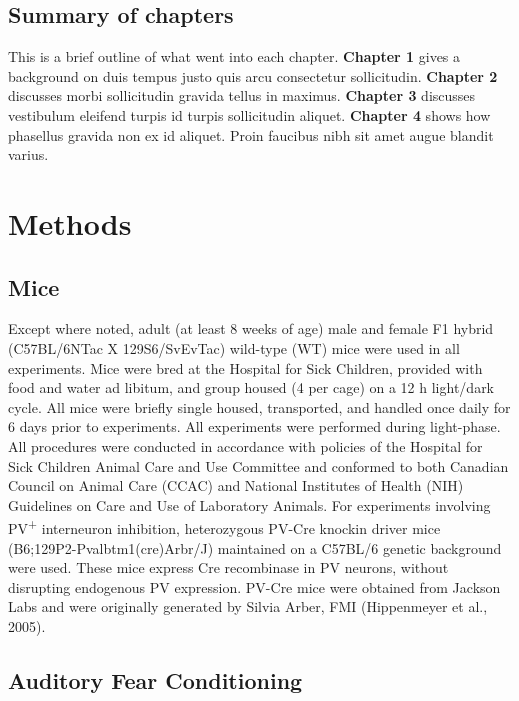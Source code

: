 \documentclass[12pt,a4paperpaper,]{report}
\begin{document}
\section{Summary of chapters}\label{summary-of-chapters}

This is a brief outline of what went into each chapter. \textbf{Chapter
1} gives a background on duis tempus justo quis arcu consectetur
sollicitudin. \textbf{Chapter 2} discusses morbi sollicitudin gravida
tellus in maximus. \textbf{Chapter 3} discusses vestibulum eleifend
turpis id turpis sollicitudin aliquet. \textbf{Chapter 4} shows how
phasellus gravida non ex id aliquet. Proin faucibus nibh sit amet augue
blandit varius.

\chapter{Methods}\label{methods}

\section{Mice}\label{mice}

Except where noted, adult (at least 8 weeks of age) male and female F1
hybrid (C57BL/6NTac X 129S6/SvEvTac) wild-type (WT) mice were used in
all experiments. Mice were bred at the Hospital for Sick Children,
provided with food and water ad libitum, and group housed (4 per cage)
on a 12 h light/dark cycle. All mice were briefly single housed,
transported, and handled once daily for 6 days prior to experiments. All
experiments were performed during light-phase. All procedures were
conducted in accordance with policies of the Hospital for Sick Children
Animal Care and Use Committee and conformed to both Canadian Council on
Animal Care (CCAC) and National Institutes of Health (NIH) Guidelines on
Care and Use of Laboratory Animals. For experiments involving
PV\textsuperscript{+} interneuron inhibition, heterozygous PV-Cre
knockin driver mice (B6;129P2-Pvalbtm1(cre)Arbr/J) maintained on a
C57BL/6 genetic background were used. These mice express Cre recombinase
in PV neurons, without disrupting endogenous PV expression. PV-Cre mice
were obtained from Jackson Labs and were originally generated by Silvia
Arber, FMI (Hippenmeyer et al., 2005).

\section{Auditory Fear Conditioning}\label{auditory-fear-conditioning}
\end{document}
